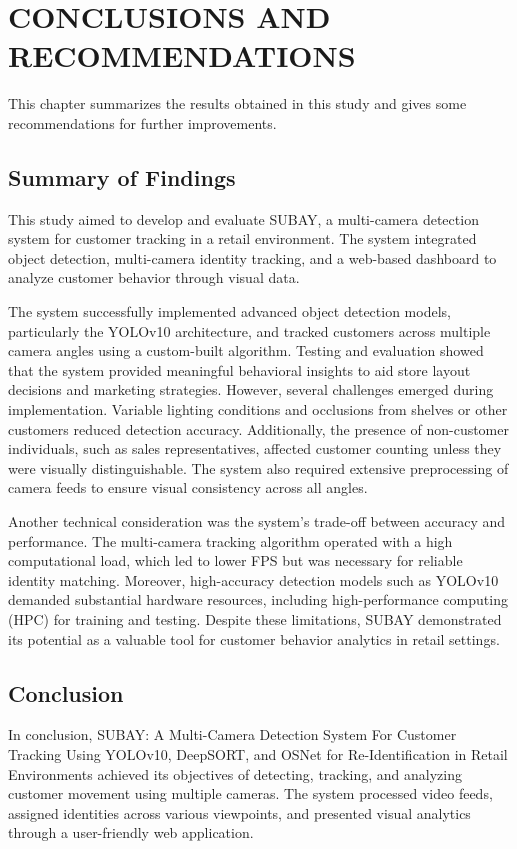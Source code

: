 \chapter{CONCLUSIONS AND RECOMMENDATIONS}
{\baselineskip

This chapter summarizes the results obtained in this study and gives some recommendations for further improvements.

\section{Summary of Findings}

This study aimed to develop and evaluate SUBAY, a multi-camera detection system for customer tracking in a retail environment. The system integrated object detection, multi-camera identity tracking, and a web-based dashboard to analyze customer behavior through visual data.

The system successfully implemented advanced object detection models, particularly the YOLOv10 architecture, and tracked customers across multiple camera angles using a custom-built algorithm. Testing and evaluation showed that the system provided meaningful behavioral insights to aid store layout decisions and marketing strategies. However, several challenges emerged during implementation. Variable lighting conditions and occlusions from shelves or other customers reduced detection accuracy. Additionally, the presence of non-customer individuals, such as sales representatives, affected customer counting unless they were visually distinguishable. The system also required extensive preprocessing of camera feeds to ensure visual consistency across all angles.

Another technical consideration was the system’s trade-off between accuracy and performance. The multi-camera tracking algorithm operated with a high computational load, which led to lower FPS but was necessary for reliable identity matching. Moreover, high-accuracy detection models such as YOLOv10 demanded substantial hardware resources, including high-performance computing (HPC) for training and testing. Despite these limitations, SUBAY demonstrated its potential as a valuable tool for customer behavior analytics in retail settings.

\section{Conclusion}
In conclusion, SUBAY: A Multi-Camera Detection System For Customer Tracking Using YOLOv10, DeepSORT, and OSNet for Re-Identification in Retail Environments achieved its objectives of detecting, tracking, and analyzing customer movement using multiple cameras. The system processed video feeds, assigned identities across various viewpoints, and presented visual analytics through a user-friendly web application.

}

